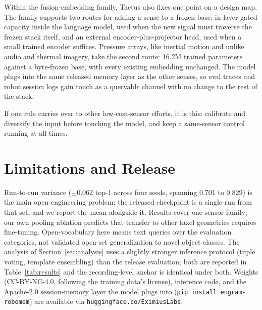\documentclass[conference]{IEEEtran}
\begin{document}
Within the fusion-embedding family, Tactus also fixes one point on a design map. The
family supports two routes for adding a sense to a frozen base: in-layer gated capacity
inside the language model, used when the new signal must traverse the frozen stack itself,
and an external encoder-plus-projector head, used when a small trained encoder suffices.
Pressure arrays, like inertial motion and unlike audio and thermal imagery, take the
second route: 16.2M trained parameters against a byte-frozen base, with every existing
embedding unchanged. The model plugs into the same released memory layer as the other
senses, so eval traces and robot session logs gain touch as a queryable channel with no
change to the rest of the stack.

If one rule carries over to other low-cost-sensor efforts, it is this: calibrate and
diversify the input before touching the model, and keep a same-sensor control running at
all times.

\section{Limitations and Release}
Run-to-run variance ($\pm$0.062 top-1 across four seeds, spanning 0.701 to 0.829) is the
main open engineering problem; the released checkpoint is a single run from that set, and
we report the mean alongside it. Results cover one sensor family; our own pooling ablation predicts
that transfer to other taxel geometries requires fine-tuning. Open-vocabulary here means
text queries over the evaluation categories, not validated open-set generalization to
novel object classes. The analysis of Section~\ref{sec:analysis} uses a slightly stronger
inference protocol (tuple voting, template ensembling) than the release evaluation; both
are reported in Table~\ref{tab:results} and the recording-level anchor is identical under
both. Weights (CC-BY-NC-4.0, following the training data's license), inference code, and
the Apache-2.0 session-memory layer the model plugs into
(\texttt{pip install engram-robomem}) are available via
\texttt{huggingface.co/EximiusLabs}.
\end{document}
